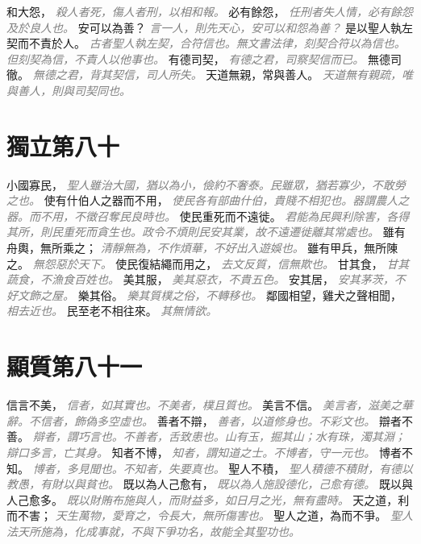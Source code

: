 \documentclass[a4paper,zihao=-4,oneside,landscape,UTF8]{ctexart}
\newcommand{\zhushi}[1]{\scriptsize{\textit{\textcolor{gray}{#1}}}\normalsize}
\begin{document}
和大怨，
\zhushi{殺人者死，傷人者刑，以相和報。}
必有餘怨，
\zhushi{任刑者失人情，必有餘怨及於良人也。}
安可以為善？
\zhushi{言一人，則先天心，安可以和怨為善？}
是以聖人執左契而不責於人。
\zhushi{古者聖人執左契，合符信也。無文書法律，刻契合符以為信也。但刻契為信，不責人以他事也。}
有德司契，
\zhushi{有德之君，司察契信而已。}
無德司徹。
\zhushi{無德之君，背其契信，司人所失。}
天道無親，常與善人。
\zhushi{天道無有親疏，唯與善人，則與司契同也。}


\section{獨立第八十}

小國寡民，
\zhushi{聖人雖治大國，猶以為小，儉約不奢泰。民雖眾，猶若寡少，不敢勞之也。}
使有什伯人之器而不用，
\zhushi{使民各有部曲什伯，貴賤不相犯也。器謂農人之器。而不用，不徵召奪民良時也。}
使民重死而不遠徙。
\zhushi{君能為民興利除害，各得其所，則民重死而貪生也。政令不煩則民安其業，故不遠遷徙離其常處也。}
雖有舟輿，無所乘之；
\zhushi{清靜無為，不作煩華，不好出入遊娛也。}
雖有甲兵，無所陳之。
\zhushi{無怨惡於天下。}
使民復結繩而用之，
\zhushi{去文反質，信無欺也。}
甘其食，
\zhushi{甘其蔬食，不漁食百姓也。}
美其服，
\zhushi{美其惡衣，不貴五色。}
安其居，
\zhushi{安其茅茨，不好文飾之屋。}
樂其俗。
\zhushi{樂其質樸之俗，不轉移也。}
鄰國相望，雞犬之聲相聞，
\zhushi{相去近也。}
民至老不相往來。
\zhushi{其無情欲。}


\section{顯質第八十一}

信言不美，
\zhushi{信者，如其實也。不美者，樸且質也。}
美言不信。
\zhushi{美言者，滋美之華辭。不信者，飾偽多空虛也。}
善者不辯，
\zhushi{善者，以道修身也。不彩文也。}
辯者不善。
\zhushi{辯者，謂巧言也。不善者，舌致患也。山有玉，掘其山；水有珠，濁其淵；辯口多言，亡其身。}
知者不博，
\zhushi{知者，謂知道之士。不博者，守一元也。}
博者不知。
\zhushi{博者，多見聞也。不知者，失要真也。}
聖人不積，
\zhushi{聖人積德不積財，有德以教愚，有財以與貧也。}
既以為人己愈有，
\zhushi{既以為人施設德化，己愈有德。}
既以與人己愈多。
\zhushi{既以財賄布施與人，而財益多，如日月之光，無有盡時。}
天之道，利而不害；
\zhushi{天生萬物，愛育之，令長大，無所傷害也。}
聖人之道，為而不爭。
\zhushi{聖人法天所施為，化成事就，不與下爭功名，故能全其聖功也。}
\end{document}
